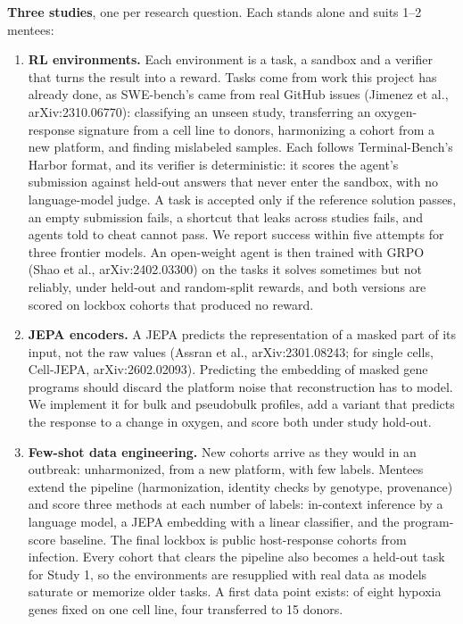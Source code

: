 \documentclass[11pt]{article}
\begin{document}
\textbf{Three studies}, one per research question. Each stands alone and suits 1--2 mentees:
\begin{enumerate}
\item \textbf{RL environments.} Each environment is a task, a sandbox and a verifier that turns the result into a reward. Tasks come from work this project has already done, as SWE-bench's came from real GitHub issues (Jimenez et al., arXiv:2310.06770): classifying an unseen study, transferring an oxygen-response signature from a cell line to donors, harmonizing a cohort from a new platform, and finding mislabeled samples. Each follows Terminal-Bench's Harbor format, and its verifier is deterministic: it scores the agent's submission against held-out answers that never enter the sandbox, with no language-model judge. A task is accepted only if the reference solution passes, an empty submission fails, a shortcut that leaks across studies fails, and agents told to cheat cannot pass. We report success within five attempts for three frontier models. An open-weight agent is then trained with GRPO (Shao et al., arXiv:2402.03300) on the tasks it solves sometimes but not reliably, under held-out and random-split rewards, and both versions are scored on lockbox cohorts that produced no reward.
\item \textbf{JEPA encoders.} A JEPA predicts the representation of a masked part of its input, not the raw values (Assran et al., arXiv:2301.08243; for single cells, Cell-JEPA, arXiv:2602.02093). Predicting the embedding of masked gene programs should discard the platform noise that reconstruction has to model. We implement it for bulk and pseudobulk profiles, add a variant that predicts the response to a change in oxygen, and score both under study hold-out.
\item \textbf{Few-shot data engineering.} New cohorts arrive as they would in an outbreak: unharmonized, from a new platform, with few labels. Mentees extend the pipeline (harmonization, identity checks by genotype, provenance) and score three methods at each number of labels: in-context inference by a language model, a JEPA embedding with a linear classifier, and the program-score baseline. The final lockbox is public host-response cohorts from infection. Every cohort that clears the pipeline also becomes a held-out task for Study 1, so the environments are resupplied with real data as models saturate or memorize older tasks. A first data point exists: of eight hypoxia genes fixed on one cell line, four transferred to 15 donors.
\end{enumerate}
\end{document}
